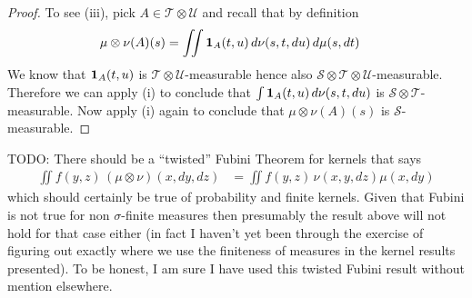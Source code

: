 \begin{proof}
To see (iii), pick $A \in \mathcal{T} \otimes \mathcal{U}$ and recall
that by definition
\begin{align*}
\mu \otimes \nu (A) (s) &= \iint \textbf{1}_{A}(t,u) \,
d\nu(s,t,du) \, d\mu(s, dt)
\end{align*}
We know that $\textbf{1}_{A}(t,u)$ is $\mathcal{T} \otimes
\mathcal{U}$-measurable hence also $\mathcal{S} \otimes \mathcal{T} \otimes
\mathcal{U}$-measurable.  Therefore we can apply (i) to conclude that $\int \textbf{1}_{A}(t,u) \,
d\nu(s,t,du)$ is $\mathcal{S} \otimes \mathcal{T}$-measurable.  Now
apply (i) again to conclude that $\mu \otimes \nu (A) (s)$ is $\mathcal{S}$-measurable.
\end{proof}

TODO: There should be a ``twisted'' Fubini Theorem for kernels that says
\begin{align*}
\iint f(y,z) \, (\mu \otimes \nu)(x, dy, dz) &= \iint f(y,z) \,\nu(x,y,dz) \mu(x, dy)
\end{align*}
which should certainly be true of probability and finite kernels.  Given that Fubini is not true for 
non $\sigma$-finite measures then presumably the result above will not hold for that case either (in fact
I haven't yet been through the exercise of figuring out exactly where we use the finiteness of measures in
the kernel results presented).  To be honest, I am sure I have used this twisted Fubini result without mention
elsewhere.

